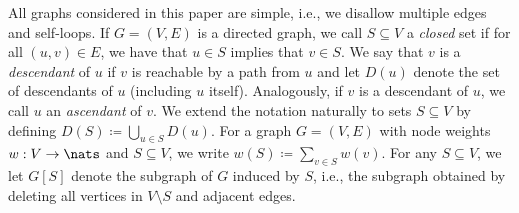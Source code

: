 All graphs considered in this paper are simple, i.e., we disallow multiple edges and self-loops. If $G=(V,E)$ is a directed graph, we call $S\subseteq V$ a \emph{closed} set if for all $(u,v)\in E$, we have that $u\in S$ implies that $v\in S$. We say that $v$ is a \emph{descendant} of $u$ if $v$ is reachable by a path from $u$ and let $D(u)$ denote the set of descendants of $u$ (including $u$ itself). Analogously, if $v$ is a descendant of $u$, we call $u$ an \emph{ascendant} of $v$. We extend the notation naturally to sets $S\subseteq V$ by defining $D(S) \coloneqq \bigcup_{u\in S} D(u)$.
For a graph $G=(V,E)$ with node weights $w: V\to \nats$ and $S\subseteq V$, we write $w(S) \coloneqq \sum_{v\in S}w(v)$. For any $S\subseteq V$, we let $G[S]$ denote the subgraph of $G$ induced by $S$, i.e., the subgraph obtained by deleting all vertices in $V\setminus S$ and adjacent edges.
%
